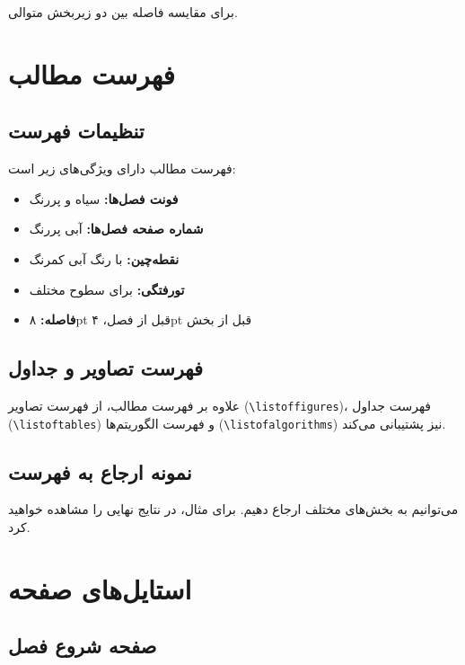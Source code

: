 \documentclass{matinbook}
\begin{document}
برای مقایسه فاصله بین دو زیربخش متوالی.

\chapter{فهرست مطالب}

\section{تنظیمات فهرست}

فهرست مطالب  دارای ویژگی‌های زیر است:

\begin{itemize}
    \item \textbf{فونت فصل‌ها:} سیاه و پررنگ
    \item \textbf{شماره صفحه فصل‌ها:} آبی پررنگ
    \item \textbf{نقطه‌چین:} با رنگ آبی کمرنگ
    \item \textbf{تورفتگی:} برای سطوح مختلف
    \item \textbf{فاصله:} ۸pt قبل از فصل، ۴pt قبل از بخش
\end{itemize}

\section{فهرست تصاویر و جداول}

علاوه بر فهرست مطالب،  از فهرست تصاویر
(\texttt{\textbackslash listoffigures})، فهرست جداول
(\texttt{\textbackslash listoftables}) و فهرست الگوریتم‌ها
(\texttt{\textbackslash listofalgorithms}) نیز پشتیبانی می‌کند.

\section{نمونه ارجاع به فهرست}

می‌توانیم به بخش‌های مختلف ارجاع دهیم. برای مثال،
در  نتایج نهایی را مشاهده خواهید کرد.

\chapter{استایل‌های صفحه}

\section{صفحه شروع فصل}
\end{document}
